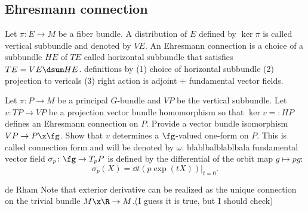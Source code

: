 \documentclass[11pt]{article}
\begin{document}
\begin{prb}
\mtprb
\end{prb}






\begin{prb}
\mtprb
\end{prb}








\subsection{Ehresmann connection}

\begin{prb}
Let $\pi\colon E\to M$ be a fiber bundle.
A distribution of $E$ defined by $\ker\pi$ is called vertical subbundle and denoted by $VE$.
An Ehresmann connection is a choice of a subbundle $HE$ of $TE$ called horizontal subbundle that satisfies $TE=VE\dsum HE$.
\q definitions by (1) choice of horizontal subbundle (2) projection to vericals (3) right action is adjoint + fundamental vector fields.
\end{prb}

\begin{prb}
Let $\pi\colon P\to M$ be a principal $G$-bundle and $VP$ be the vertical subbundle.
Let $v\colon TP\to VP$ be a projection vector bundle homomorphism so that $\ker v=:HP$ defines an Ehresmann connection on $P$.
\q Provide a vector bundle isomorphism $VP\to P\x\fg$.
\q Show that $v$ determines a $\fg$-valued one-form on $P$. This is called connection form and will be denoted by $\omega$. blablbalblablbala
\q fundamental vector field $\sigma_p\colon\fg\to T_pP$ is defined by the differential of the orbit map $g\mapsto pg$: \[\sigma_p(X)=\dd{t}(p\exp(tX))|_{t=0}.\]
\end{prb}


\begin{prb}
\mtprb
\end{prb}

\begin{prb}
\mtprb
\end{prb}








\begin{prb}
de Rham
\q Note that exterior derivative can be realized as the unique connection on the trivial bundle $M\x\R\to M$.(I guess it is true, but I should check)
\end{prb}
\end{document}

